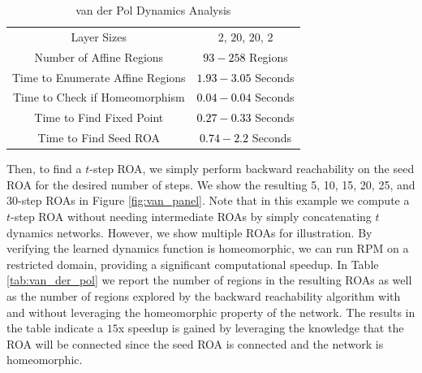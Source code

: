 
\begingroup
\setlength{\tabcolsep}{5pt}
\begin{table}[h]
    \centering
    \caption{van der Pol Dynamics Analysis}
    {\color{black}\begin{tabular}{c | c}
        Layer Sizes & $2$, $20$, $20$, $2$ \\
        Number of Affine Regions & \textcolor{black}{$93 - 258$} Regions \\
        Time to Enumerate Affine Regions & \textcolor{black}{$1.93 - 3.05$} Seconds \\
        Time to Check if Homeomorphism & \textcolor{black}{$0.04 - 0.04$} Seconds \\
        Time to Find Fixed Point & \textcolor{black}{$0.27 - 0.33$} Seconds \\
        Time to Find Seed ROA & \textcolor{black}{$0.74 - 2.2$} Seconds
    \end{tabular}}
    \label{tab:van_details}
\end{table} 
\endgroup



Then, to find a $t$-step ROA, we simply perform backward reachability on the seed ROA for the desired number of steps.
We show the resulting 5, 10, 15, 20, 25, and 30-step ROAs in Figure \ref{fig:van_panel}. 
Note that in this example we compute a $t$-step ROA without needing intermediate ROAs by simply concatenating $t$ dynamics networks. 
However, we show multiple ROAs for illustration. By verifying the learned dynamics function is homeomorphic, we can run RPM on a restricted domain, providing a significant computational speedup. 
In Table \ref{tab:van_der_pol} we report the number of regions in the resulting ROAs as well as the number of regions explored by the backward reachability algorithm with and without leveraging the homeomorphic property of the network. 
The results in the table indicate a $15$x speedup is gained by leveraging the knowledge that the ROA will be connected since the seed ROA is connected and the network is homeomorphic.

